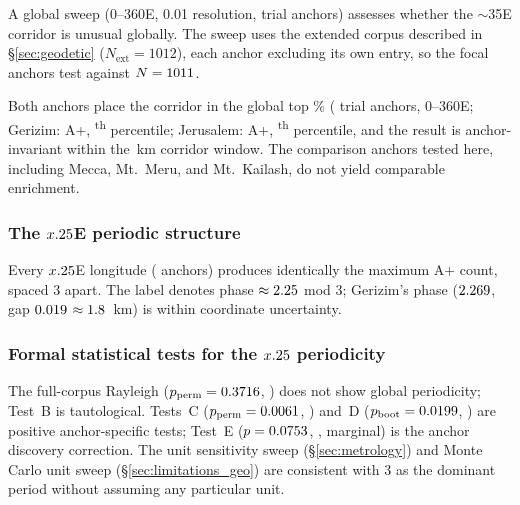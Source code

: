 A global sweep (0--360\textdegree{}E, 0.01\textdegree{} resolution,
\anchorSweepNanchors{} trial anchors) assesses whether the
$\sim$35\textdegree{}E corridor is unusual globally.
The sweep uses the extended corpus described in \S\ref{sec:geodetic}
($N_\mathrm{ext} = 1012$), each anchor excluding its own entry,
so the focal anchors test against $N = 1011$.

Both anchors place the corridor in the global top \anchorSweepTopPct\%
(\anchorSweepNanchors{} trial anchors, 0--360\textdegree{}E;
Gerizim: \GerizimSweepAp{} A+, \anchorSweepPctile\textsuperscript{th} percentile;
Jerusalem: \JerusalemSweepAp{} A+, \JerusalemSweepPctile\textsuperscript{th} percentile, and the result is anchor-invariant
within the \GerizimJerusalemKm\,km corridor window.
The comparison anchors tested here, including Mecca, Mt.\ Meru, and
Mt.\ Kailash, do not yield comparable enrichment.

\subsubsection*{The $x.25$\textdegree{}E periodic structure}
\label{sec:phase_peak_artifact}

Every $x.25$\textdegree{}E longitude (\NharmonicsCoarse{} anchors)
produces identically the maximum A+ count, spaced 3\textdegree{} apart.
The label denotes phase $\approx 2.25$\textdegree{} mod 3\textdegree{};
Gerizim's phase ($2.269$\textdegree{}, gap $0.019$\textdegree{}
$\approx 1.8$~km) is within coordinate uncertainty.

\subsubsection*{Formal statistical tests for the $x.25$\textdegree{} periodicity}
\label{sec:phase_peak_formal}

The full-corpus Rayleigh ($p_\mathrm{perm} = 0.3716$, \fullRayleighPermPSig{}) does not show
global periodicity; Test~B is tautological.
Tests~C ($p_\mathrm{perm} = 0.0061$, \anchorShiftPermPSig{}) and~D ($p_\mathrm{boot} = 0.0199$, \targetedPfullSig{})
are positive anchor-specific tests; Test~E ($p = 0.0753$, \anchorMaxPermPSig{}, marginal) is the anchor discovery correction.
The unit sensitivity sweep (\S\ref{sec:metrology}) and Monte Carlo unit sweep
(\S\ref{sec:limitations_geo}) are consistent with 3\textdegree{} as the dominant
period without assuming any particular unit.

